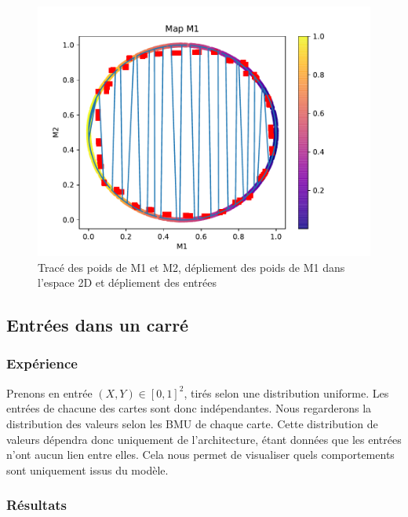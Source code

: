 \begin{figure}
\begin{minipage}{0.33\textwidth}
\includegraphics[width=\textwidth]{2som_cercle_din.pdf}
\end{minipage}
\label{fig:2som_square}
\caption{Tracé des poids de M1 et M2, dépliement des poids de M1 dans l'espace 2D et dépliement des entrées}
\end{figure}

\subsection{Entrées dans un carré}

\subsubsection{Expérience}
Prenons en entrée $(X,Y) \in [0,1]^2$, tirés selon une distribution uniforme. Les entrées de chacune des cartes sont donc indépendantes. Nous regarderons la distribution des valeurs selon les BMU de chaque carte. Cette distribution de valeurs dépendra donc uniquement de l'architecture, étant données que les entrées n'ont aucun lien entre elles. Cela nous permet de visualiser quels comportements sont uniquement issus du modèle.
 
\subsubsection{Résultats}

